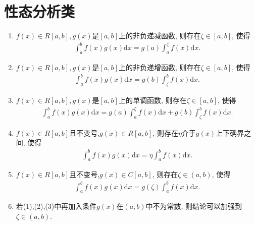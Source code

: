 \documentclass[../../main.tex]{subfiles}
\begin{document}
\section{性态分析类}

\begin{theorem}[积分中值定理]\label{theorem:积分中值定理}
\begin{enumerate}[(1)]
\item \label{theorem:积分中值定理(1)}\(f(x)\in R[a,b],g(x)\)是\([a,b]\)上的非负递减函数, 则存在\(\zeta\in[a,b]\), 使得
\begin{align*}
\int_{a}^{b}f(x)g(x)\mathrm{d}x = g(a)\int_{a}^{\zeta}f(x)\mathrm{d}x.
\end{align*}

\item \label{theorem:积分中值定理(2)} \(f(x)\in R[a,b],g(x)\)是\([a,b]\)上的非负递增函数, 则存在\(\zeta\in[a,b]\), 使得
\begin{align*}
\int_{a}^{b}f(x)g(x)\mathrm{d}x = g(b)\int_{\zeta}^{b}f(x)\mathrm{d}x.
\end{align*}

\item \label{theorem:积分中值定理(3)}\(f(x)\in R[a,b],g(x)\)是\([a,b]\)上的单调函数, 则存在\(\zeta\in[a,b]\), 使得
\begin{align*}
\int_{a}^{b}f(x)g(x)\mathrm{d}x = g(a)\int_{a}^{\zeta}f(x)\mathrm{d}x + g(b)\int_{\zeta}^{b}f(x)\mathrm{d}x.
\end{align*}

\item \label{theorem:积分中值定理(4)}\(f(x)\in R[a,b]\)且不变号,\(g(x)\in R[a,b]\), 则存在\(\eta\)介于\(g(x)\)上下确界之间, 使得
\begin{align*}
\int_{a}^{b}f(x)g(x)\mathrm{d}x = \eta\int_{a}^{b}f(x)\mathrm{d}x.
\end{align*}

\item \label{theorem:积分中值定理(5)}\(f(x)\in R[a,b]\)且不变号,\(g(x)\in C[a,b]\), 则存在\(\zeta\in(a,b)\), 使得
\begin{align*}
\int_{a}^{b}f(x)g(x)\mathrm{d}x = g(\zeta)\int_{a}^{b}f(x)\mathrm{d}x.
\end{align*}

\item 若(1),(2),(3)中再加入条件\(g(x)\)在\((a,b)\)中不为常数, 则结论可以加强到\(\zeta\in(a,b)\).
\end{enumerate}
\end{theorem}
\end{document}
